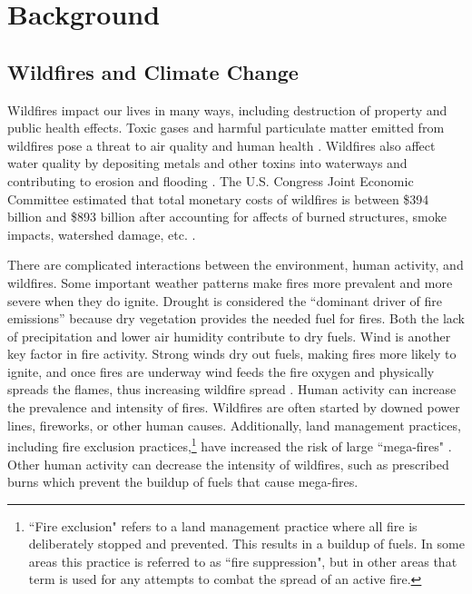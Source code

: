 \documentclass[11pt]{article}%
\begin{document}
\newpage
\tableofcontents
\newpage

\section{Background}
\subsection{Wildfires and Climate Change}

Wildfires impact our lives in many ways, including destruction of property and public health effects. Toxic gases and harmful particulate matter emitted from wildfires pose a threat to air quality and human health \cite{WHO-2024-WFS}. Wildfires also affect water quality by depositing metals and other toxins into waterways and contributing to erosion and flooding \cite{USGS-2024-WQA}. The U.S. Congress Joint Economic Committee estimated that total monetary costs of wildfires is between \$394 billion and \$893 billion after accounting for affects of burned structures, smoke impacts, watershed damage, etc. \cite{JEC-2023-CEW}.

There are complicated interactions between the environment, human activity, and wildfires. Some important weather patterns make fires more prevalent and more severe when they do ignite. Drought is considered the “dominant driver of fire emissions” \cite{IPCC-2021-LCI} because dry vegetation provides the needed fuel for fires. Both the lack of precipitation and lower air humidity contribute to dry fuels. Wind is another key factor in fire activity. Strong winds dry out fuels, making fires more likely to ignite, and once fires are underway wind feeds the fire oxygen and physically spreads the flames, thus increasing wildfire spread \cite{Richardson-2022-GIW}. Human activity can increase the prevalence and intensity of fires. Wildfires are often started by downed power lines, fireworks, or other human causes. Additionally, land management practices, including fire exclusion practices,\footnote{``Fire exclusion" refers to a land management practice where all fire is deliberately stopped and prevented. This results in a buildup of fuels. In some areas this practice is referred to as ``fire suppression", but in other areas that term is used for any attempts to combat the spread of an active fire.} have increased the risk of large ``mega-fires" \cite{Williams-2013-EOH}. Other human activity can decrease the intensity of wildfires, such as prescribed burns which prevent the buildup of fuels that cause mega-fires.
\end{document}
